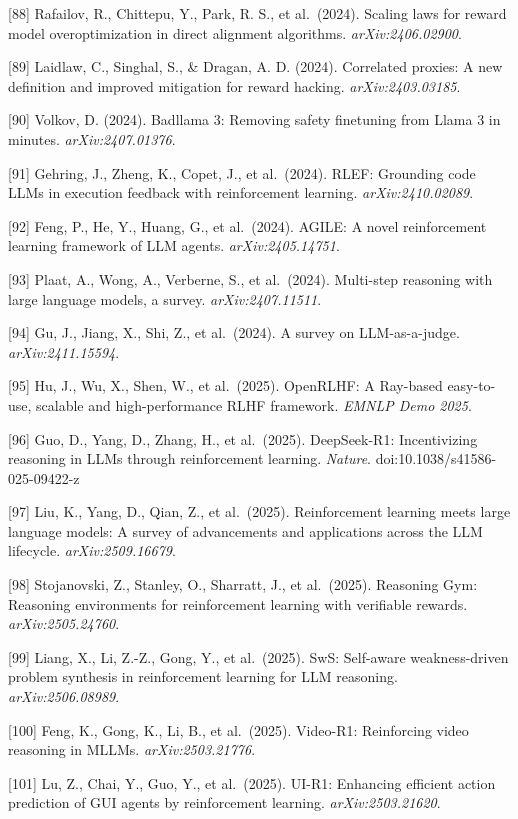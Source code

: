 {[}88{]} Rafailov, R., Chittepu, Y., Park, R. S., et al.~(2024). Scaling laws for reward model overoptimization in direct alignment algorithms. \emph{arXiv:2406.02900}.

{[}89{]} Laidlaw, C., Singhal, S., \& Dragan, A. D. (2024). Correlated proxies: A new definition and improved mitigation for reward hacking. \emph{arXiv:2403.03185}.

{[}90{]} Volkov, D. (2024). Badllama 3: Removing safety finetuning from Llama 3 in minutes. \emph{arXiv:2407.01376}.

{[}91{]} Gehring, J., Zheng, K., Copet, J., et al.~(2024). RLEF: Grounding code LLMs in execution feedback with reinforcement learning. \emph{arXiv:2410.02089}.

{[}92{]} Feng, P., He, Y., Huang, G., et al.~(2024). AGILE: A novel reinforcement learning framework of LLM agents. \emph{arXiv:2405.14751}.

{[}93{]} Plaat, A., Wong, A., Verberne, S., et al.~(2024). Multi-step reasoning with large language models, a survey. \emph{arXiv:2407.11511}.

{[}94{]} Gu, J., Jiang, X., Shi, Z., et al.~(2024). A survey on LLM-as-a-judge. \emph{arXiv:2411.15594}.

{[}95{]} Hu, J., Wu, X., Shen, W., et al.~(2025). OpenRLHF: A Ray-based easy-to-use, scalable and high-performance RLHF framework. \emph{EMNLP Demo 2025}.

{[}96{]} Guo, D., Yang, D., Zhang, H., et al.~(2025). DeepSeek-R1: Incentivizing reasoning in LLMs through reinforcement learning. \emph{Nature}. doi:10.1038/s41586-025-09422-z

{[}97{]} Liu, K., Yang, D., Qian, Z., et al.~(2025). Reinforcement learning meets large language models: A survey of advancements and applications across the LLM lifecycle. \emph{arXiv:2509.16679}.

{[}98{]} Stojanovski, Z., Stanley, O., Sharratt, J., et al.~(2025). Reasoning Gym: Reasoning environments for reinforcement learning with verifiable rewards. \emph{arXiv:2505.24760}.

{[}99{]} Liang, X., Li, Z.-Z., Gong, Y., et al.~(2025). SwS: Self-aware weakness-driven problem synthesis in reinforcement learning for LLM reasoning. \emph{arXiv:2506.08989}.

{[}100{]} Feng, K., Gong, K., Li, B., et al.~(2025). Video-R1: Reinforcing video reasoning in MLLMs. \emph{arXiv:2503.21776}.

{[}101{]} Lu, Z., Chai, Y., Guo, Y., et al.~(2025). UI-R1: Enhancing efficient action prediction of GUI agents by reinforcement learning. \emph{arXiv:2503.21620}.

